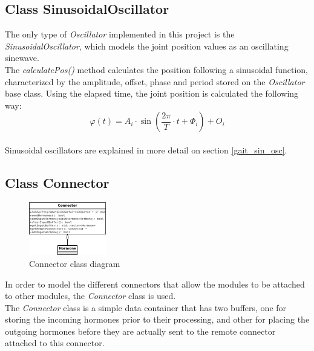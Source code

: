 \subsection{Class SinusoidalOscillator}
\label{software_class_sinusoidaloscillator}

The only type of \emph{Oscillator} implemented in this project is the \emph{SinusoidalOscillator}, which models the joint position values as an oscillating sinewave.\\

The \emph{calculatePos()} method calculates the position following a sinusoidal function, characterized by the amplitude, offset, phase and period stored on the \emph{Oscillator} base class. Using the elapsed time, the joint position is calculated the following way:
\begin{equation} \label{eq:software_sinusoidal_oscillator}
\varphi(t) = A_i \cdot \sin{\left( \frac{2\pi}{T} \cdot t + \Phi_i \right)} + O_i
\end{equation}\\

Sinusoidal oscillators are explained in more detail on section \ref{gait_sin_osc}.

\subsection{Class Connector}
\label{software_class_connector}

\begin{figure}[h]
		\centering
        \includegraphics[width=0.3\textwidth]{images/Class_diagram_Connector.png}
        \caption{Connector class diagram}\label{fig:software_class_connector_class}
\end{figure}


In order to model the different connectors that allow the modules to be attached to other modules, the \emph{Connector} class is used.\\

The \emph{Connector} class is a simple data container that has two buffers, one for storing the incoming hormones prior to their processing, and other for placing the outgoing hormones before they are actually sent to the remote connector attached to this connector.\\

